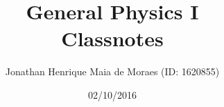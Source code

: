 \title{General Physics I \\ Classnotes}
\author{Jonathan Henrique Maia de Moraes (ID: 1620855)}
\date{02/10/2016}
\maketitle
